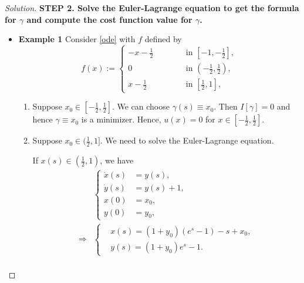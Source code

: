\documentclass[english,reqno]{amsart}
\newenvironment{solution}
  {\renewcommand\qedsymbol{$\blacksquare$}\begin{proof}[Solution]}
  {\end{proof}}
\begin{document}
\begin{enumerate}[label=\arabic*)]
\begin{solution}
\textbf{STEP 2. Solve the Euler-Lagrange equation to get the formula for $\gamma$ and compute the cost function value for $\gamma$.} 

\begin{itemize}
    \item \textbf{Example 1}
    Consider \eqref{ode} with $f$ defined by
\begin{equation*}
        f(x) := \left\{
  \begin{aligned}
  -x -\frac{1}{2}   \, \quad \qquad &\text{in } [-1, -\frac{1}{2}], \\
   0 \, \quad \qquad &\text{in } (-\frac{1}{2}, \frac{1}{2}), \\
              x-\frac{1}{2}  \qquad  \quad &\text{in } [\frac{1}{2}, 1],
  \end{aligned}
\right.
    \end{equation*}
    
    \begin{enumerate}
        \item Suppose $x_0 \in [-\frac{1}{2}, \frac{1}{2}]$. We can choose $\gamma (s) \equiv x_0$. Then $I[\gamma]=0$ and hence $\gamma \equiv x_0$ is a minimizer. Hence, $u(x)=0$ for $x \in [-\frac{1}{2}, \frac{1}{2}]$.
        \item Suppose $x_0 \in (\frac{1}{2}, 1]$. We need to solve the Euler-Lagrange equation.
        
        If $x(s) \in (\frac{1}{2}, 1)$, we have
        \begin{equation*}
        \begin{aligned}
        &\left\{
        \begin{aligned}
        \dot{x}(s)&=y(s),\\
        \dot{y}(s)&=y(s) + 1,\\
         x(0)&=x_0,\\
         y(0)&=y_0,
        \end{aligned}
        \right.\\
        \Longrightarrow &
        \left\{
        \begin{aligned}
         	& x(s)=(1+y_0)(e^s-1)-s+x_0,\\
         	& y(s)=(1+y_0)e^s-1.
        \end{aligned}
        \right.\\
        \end{aligned}
        \end{equation*}
        

\end{enumerate}
\end{itemize}
\end{solution}
\end{enumerate}
\end{document}
